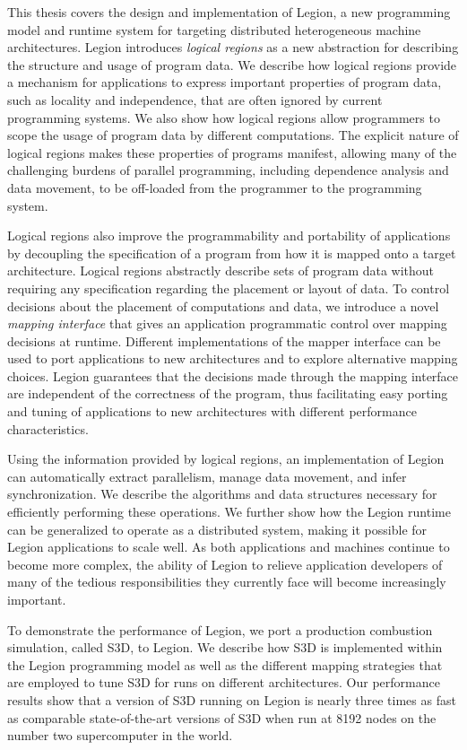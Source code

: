 
\beforepreface
{}
\label{sec:abstract}

This thesis covers the design and implementation of Legion,
a new programming model and runtime system for targeting
distributed heterogeneous machine architectures. Legion
introduces {\em logical regions} as a new abstraction for 
describing the structure and
usage of program data. We describe how logical regions 
provide a mechanism for applications to express important 
properties of program data, such as locality and independence, 
that are often ignored by current programming systems. We also
show how logical regions allow programmers to scope the usage of 
program data by different computations. The explicit nature of 
logical regions makes these properties of programs manifest, 
allowing many of the challenging burdens of parallel programming,
including dependence analysis and data movement, to be off-loaded 
from the programmer to the programming system.

Logical regions also improve the programmability and portability 
of applications by decoupling the specification of a program 
from how it is mapped onto a target architecture. Logical
regions abstractly describe sets of program data without
requiring any specification regarding the placement or layout of data.
To control decisions about the placement of computations
and data, we introduce a novel {\em mapping interface}
that gives an application programmatic control over mapping 
decisions at runtime. Different implementations
of the mapper interface can be used to port applications
to new architectures and to explore alternative mapping
choices. Legion guarantees that the decisions made through 
the mapping interface are independent of the correctness 
of the program, thus facilitating easy porting and tuning 
of applications to new architectures with different performance
characteristics.

Using the information provided by logical regions,
an implementation of Legion can automatically
extract parallelism, manage data movement, and infer
synchronization. We describe the algorithms and data
structures necessary for efficiently performing these
operations. We further show how the Legion runtime can 
be generalized to operate as a distributed system, making 
it possible for Legion applications to scale well.
As both applications and machines continue to become more 
complex, the ability of Legion to relieve application 
developers of many of the tedious responsibilities
they currently face will become increasingly important. 

To demonstrate the performance of Legion, we port a
production combustion simulation, called S3D, to Legion. 
We describe how S3D is implemented within the Legion
programming model as well as the different mapping
strategies that are employed to tune S3D for runs
on different architectures. Our performance results
show that a version of S3D running on Legion is 
nearly three times as fast as comparable state-of-the-art
versions of S3D when run at 8192 nodes on the number
two supercomputer in the world.

